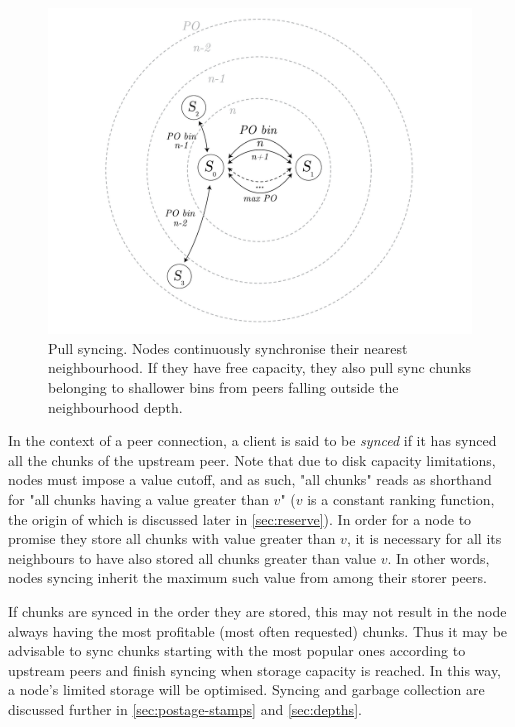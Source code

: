 \begin{figure}[htbp]
   \centering
   \includegraphics[width=\textwidth]{fig/pull-sync.pdf}
   \caption[Pull syncing \statusgreen]{Pull syncing. Nodes continuously synchronise their nearest neighbourhood. If they have free capacity, they also pull sync chunks belonging to shallower bins from peers falling outside the neighbourhood depth.}
   \label{fig:pull-syncing}
\end{figure}

In the context of a peer connection, a client is said to be \emph{synced} if it has synced all the chunks of the upstream peer. Note that due to disk capacity limitations, nodes must impose a value cutoff, and as such, "all chunks" reads as shorthand for "all chunks having a value greater than $v$" ($v$ is a constant ranking function, the origin of which is discussed later in \ref{sec:reserve}). In order for a node to promise they store all chunks with value greater than $v$, it is necessary for all its neighbours to have also stored all chunks greater than value $v$. In other words, nodes syncing inherit the maximum such value from among their storer peers. 

If chunks are synced in the order they are stored, this may not result in the node always having the most profitable (most often requested) chunks. Thus it may be advisable to sync chunks starting with the most popular ones according to upstream peers and finish syncing when storage capacity is reached. In this way, a node's limited storage will be optimised. Syncing and garbage collection are discussed further in \ref{sec:postage-stamps} and \ref{sec:depths}.

